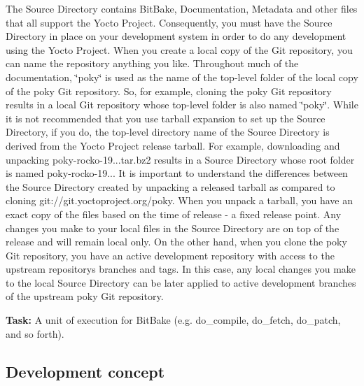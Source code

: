 \begin{DoxyItemize}
The Source Directory contains Bit\+Bake, Documentation, Metadata and other files that all support the Yocto Project. Consequently, you must have the Source Directory in place on your development system in order to do any development using the Yocto Project. When you create a local copy of the Git repository, you can name the repository anything you like. Throughout much of the documentation, \char`\"{}poky\char`\"{} is used as the name of the top-\/level folder of the local copy of the poky Git repository. So, for example, cloning the poky Git repository results in a local Git repository whose top-\/level folder is also named \char`\"{}poky\char`\"{}. While it is not recommended that you use tarball expansion to set up the Source Directory, if you do, the top-\/level directory name of the Source Directory is derived from the Yocto Project release tarball. For example, downloading and unpacking poky-\/rocko-\/19...\+tar.\+bz2 results in a Source Directory whose root folder is named poky-\/rocko-\/19... It is important to understand the differences between the Source Directory created by unpacking a released tarball as compared to cloning git\+://git.yoctoproject.\+org/poky. When you unpack a tarball, you have an exact copy of the files based on the time of release -\/ a fixed release point. Any changes you make to your local files in the Source Directory are on top of the release and will remain local only. On the other hand, when you clone the poky Git repository, you have an active development repository with access to the upstream repository\textquotesingle{}s branches and tags. In this case, any local changes you make to the local Source Directory can be later applied to active development branches of the upstream poky Git repository.
\item {\bfseries Task\+:} A unit of execution for Bit\+Bake (e.\+g. do\+\_\+compile, do\+\_\+fetch, do\+\_\+patch, and so forth).
\end{DoxyItemize}

\subsection*{Development concept}

